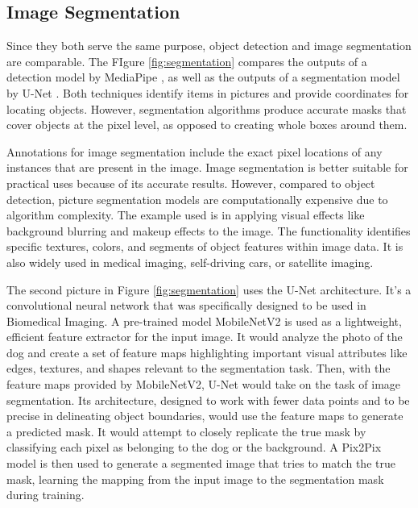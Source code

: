 \subsection{Image Segmentation}

Since they both serve the same purpose, object detection and image segmentation are comparable. The FIgure \ref{fig:segmentation} compares the outputs of a detection model by MediaPipe \cite{mediapipePoseLandmarker}, as well as the outputs of a segmentation model by U-Net \cite{ronneberger2015u}. Both techniques identify items in pictures and provide coordinates for locating objects. However, segmentation algorithms produce accurate masks that cover objects at the pixel level, as opposed to creating whole boxes around them.

Annotations for image segmentation include the exact pixel locations of any instances that are present in the image. Image segmentation is better suitable for practical uses because of its accurate results. However, compared to object detection, picture segmentation models are computationally expensive due to algorithm complexity.
The example used is in applying visual effects like background blurring and makeup effects to the image. The functionality identifies specific textures, colors, and segments of object features within image data. It is also widely used in medical imaging, self-driving cars, or satellite imaging.

The second picture in Figure \ref{fig:segmentation} uses the U-Net architecture. It's a convolutional neural network that was specifically designed to be used in Biomedical Imaging. A pre-trained model MobileNetV2 \cite{sandler2018mobilenetv2} is used as a lightweight, efficient feature extractor for the input image. It would analyze the photo of the dog and create a set of feature maps highlighting important visual attributes like edges, textures, and shapes relevant to the segmentation task. Then, with the feature maps provided by MobileNetV2, U-Net would take on the task of image segmentation. Its architecture, designed to work with fewer data points and to be precise in delineating object boundaries, would use the feature maps to generate a predicted mask. It would attempt to closely replicate the true mask by classifying each pixel as belonging to the dog or the background. A Pix2Pix \cite{isola2017image} model is then used to generate a segmented image that tries to match the true mask, learning the mapping from the input image to the segmentation mask during training.

